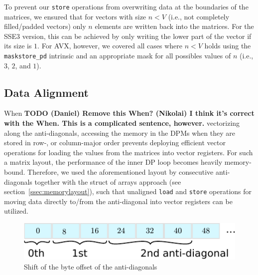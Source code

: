 \documentclass[runningheads,a4paper]{llncs}
\begin{document}
To prevent our \texttt{store} operations from overwriting data at the boundaries
of the matrices, we ensured that for vectors with size $n < V$ (i.e.,
not completely filled/padded vectors) only $n$ elements are written back into the
matrices.  For the SSE3 version, this can be achieved by only writing the lower
part of the vector if its size is $1$.  For AVX, however, we covered all cases
where $n < V$ holds using the \texttt{maskstore\_pd} intrinsic and an appropriate mask
for all possibles values of $n$ (i.e., $3$, $2$, and $1$).

\subsection{Data Alignment}
\label{ssec:dataalignment}

When {\bf TODO (Daniel) Remove this When? (Nikolai) I think it's correct with the When. This is a complicated sentence, however.} vectorizing along the anti-diagonals, accessing the memory in the DPMs when they are stored in row-, or column-major order
prevents deploying efficient vector operations for loading the values from the matrices into vector registers.
For such a matrix layout, the performance of the inner DP loop becomes heavily memory-bound.
Therefore, we used the aforementioned layout by consecutive anti-diagonals together with the struct of arrays approach (see section~\ref{ssec:memorylayout}),
such that unaligned \texttt{load} and \texttt{store} operations for moving data directly to/from the anti-diagonal
into vector registers can be utilized.


\begin{figure}[ht!]
  \centering
  \includegraphics[scale=0.9]{figures/unaligned.pdf}
  \caption{Shift of the byte offset of the anti-diagonals}
  \label{fig:unaligned}
\end{figure}
\end{document}
